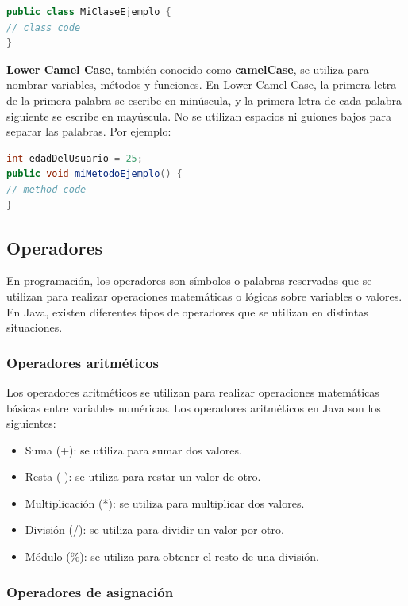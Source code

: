 \documentclass[executivepaper]{article}
\begin{document}
\begin{lstlisting}[language=Java]
public class MiClaseEjemplo {
// class code
}
\end{lstlisting}

\textbf{Lower Camel Case}, también conocido como \textbf{camelCase}, se utiliza para nombrar variables, métodos y funciones. En Lower Camel Case, la primera letra de la primera palabra se escribe en minúscula, y la primera letra de cada palabra siguiente se escribe en mayúscula. No se utilizan espacios ni guiones bajos para separar las palabras. Por ejemplo:

\begin{lstlisting}[language=Java]
int edadDelUsuario = 25;
public void miMetodoEjemplo() {
// method code
}
\end{lstlisting}

\subsection{Operadores}
En programación, los operadores son símbolos o palabras reservadas que se utilizan para realizar operaciones matemáticas o lógicas sobre variables o valores. En Java, existen diferentes tipos de operadores que se utilizan en distintas situaciones.

\subsubsection*{Operadores aritméticos}

Los operadores aritméticos se utilizan para realizar operaciones matemáticas básicas entre variables numéricas. Los operadores aritméticos en Java son los siguientes:

\begin{itemize}
\item Suma (+): se utiliza para sumar dos valores.
\item Resta (-): se utiliza para restar un valor de otro.
\item Multiplicación (*): se utiliza para multiplicar dos valores.
\item División (/): se utiliza para dividir un valor por otro.
\item Módulo (\%): se utiliza para obtener el resto de una división.
\end{itemize}

\subsubsection*{Operadores de asignación}
\end{document}
